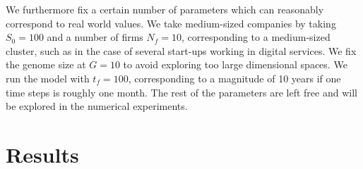 \documentclass[letterpaper]{article}
\begin{document}
We furthermore fix a certain number of parameters which can reasonably correspond to real world values. We take medium-sized companies by taking $S_0 = 100$ and a number of firms $N_f = 10$, corresponding to a medium-sized cluster, such as in the case of several start-ups working in digital services. We fix the genome size at $G = 10$ to avoid exploring too large dimensional spaces. We run the model with $t_f = 100$, corresponding to a magnitude of 10 years if one time steps is roughly one month. The rest of the parameters are left free and will be explored in the numerical experiments.

\section{Results}



\begin{table}[t]
\caption{Saltelli sensitivity indices, for indicators at $t_f$ in rows and parameters in columns. We give for each pair the first order index (F) and the total order index (T). Non-significant values were assimilated to 0.\label{tab:gsa}}
\end{table}
\end{document}
